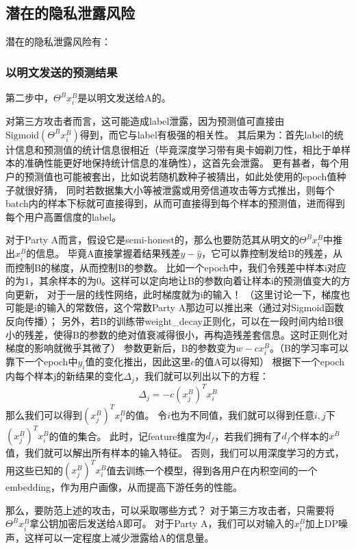 \documentclass[twoside,11pt]{article}
\begin{document}
\subsection{潜在的隐私泄露风险}

潜在的隐私泄露风险有：

\subsubsection{以明文发送的预测结果}
第二步中，$\Theta^B x_i^B$是以明文发送给A的。

对第三方攻击者而言，这可能造成label泄露，因为预测值可直接由$\mathrm{Sigmoid}(\Theta^B x_i^B)$得到，而它与label有极强的相关性。
其后果为：首先label的统计信息和预测值的统计信息很相近（毕竟深度学习带有奥卡姆剃刀性，相比于单样本的准确性能更好地保持统计信息的准确性），这首先会泄露。
更有甚者，每个用户的预测值也可能被套出，比如说若随机数种子被猜出，如此处使用的epoch值种子就很好猜，
同时若数据集大小等被泄露或用旁信道攻击等方式推出，则每个batch内的样本下标就可直接得到，从而可直接得到每个样本的预测值，进而得到每个用户高置信度的label。

对于Party A而言，假设它是semi-honest的，那么也要防范其从明文的$\Theta^B x_i^B$中推出$x_i^B$的信息。
毕竟A直接掌握着结果残差$y-\hat{y}$，它可以靠控制发给B的残差，从而控制B的梯度，从而控制B的参数。
比如一个epoch中，我们令残差中样本i对应的为1，其余样本的为0。这样可以定向地让B的参数向着让样本i的预测值变大的方向更新，
对于一层的线性网络，此时梯度就为i的输入！
（这里讨论一下，梯度也可能是i的输入的常数倍，这个常数Party A那边可以推出来（通过对Sigmoid函数反向传播）；
另外，若B的训练带weight_decay正则化，可以在一段时间内给B很小的残差，使得B的参数的绝对值衰减得很小，再构造残差套信息。这时正则化对梯度的影响就微乎其微了）
参数更新后，B的参数变为$w - c x_i^B$。（B的学习率可以靠下一个epoch中$y_i$值的变化推出，因此这里$c$的值A可以得知）
根据下一个epoch内每个样本j的新结果的变化$\Delta_j$，我们就可以列出以下的方程：
$$
    \Delta_j =  - c (x_j^B)^T x_i^B
$$
那么我们可以得到$(x_j^B)^T x_i^B$的值。
令$i$也为不同值，我们就可以得到任意$i,j$下$(x_j^B)^T x_i^B$的值的集合。
此时，记feature维度为$d_f$，若我们拥有了$d_f$个样本的$x^B$值，我们就可以解出所有样本的输入特征。
否则，我们可以用深度学习的方式，用这些已知的$(x_j^B)^T x_i^B$值去训练一个模型，得到各用户在内积空间的一个embedding，作为用户画像，从而提高下游任务的性能。

那么，要防范上述的攻击，可以采取哪些方式？
对于第三方攻击者，只需要将$\Theta^B x_i^B$拿公钥加密后发送给A即可。
对于Party A，我们可以对输入的$x_i^B$加上DP噪声，这样可以一定程度上减少泄露给A的信息量。
\end{document}
